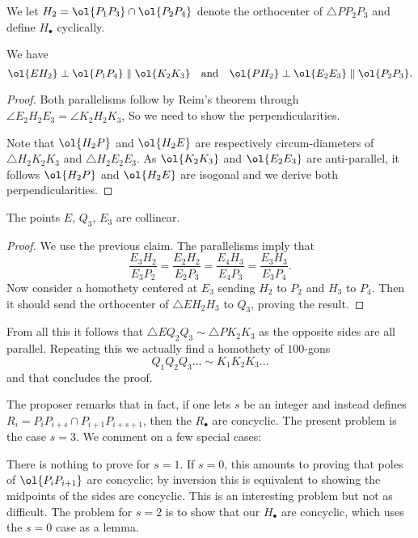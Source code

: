 We let $H_2 = \ol{P_1P_3} \cap \ol{P_2P_4}$
denote the orthocenter of $\triangle PP_2P_3$
and define $H_\bullet$ cyclically.
\begin{claim*}
  We have
  \[ \ol{EH_2} \perp \ol{P_1 P_4} \parallel \ol{K_2 K_3}
    \quad\text{and}\quad
    \ol{PH_2} \perp \ol{E_2 E_3} \parallel \ol{P_2 P_3}.  \]
\end{claim*}
\begin{proof}
  Both parallelisms follow by Reim's theorem through
  $\angle E_2 H_2 E_3 = \angle K_2 H_2 K_3$,
  So we need to show the perpendicularities.

  Note that $\ol{H_2 P}$ and $\ol{H_2 E}$
  are respectively circum-diameters of
  $\triangle H_2K_2K_3$ and $\triangle H_2E_2E_3$.
  As $\ol{K_2 K_3}$ and $\ol{E_2 E_3}$ are anti-parallel,
  it follows $\ol{H_2P}$ and $\ol{H_2E}$ are isogonal
  and we derive both perpendicularities.
\end{proof}

\begin{claim*}
  The points $E$, $Q_3$, $E_3$ are collinear.
\end{claim*}
\begin{proof}
  We use the previous claim.
  The parallelisms imply that
  \[ \frac{E_3H_2}{E_3P_2} = \frac{E_2H_2}{E_2P_3}
    = \frac{E_4H_3}{E_4P_3} = \frac{E_3H_3}{E_3P_4}. \]
  Now consider a homothety centered at $E_3$ sending $H_2$ to $P_2$
  and $H_3$ to $P_4$.
  Then it should send the orthocenter of $\triangle EH_2H_3$ to $Q_3$,
  proving the result.
\end{proof}

From all this it follows that $\triangle EQ_2Q_3 \sim \triangle PK_2K_3$
as the opposite sides are all parallel.
Repeating this we actually find a homothety of $100$-gons
\[ Q_1 Q_2 Q_3 \dots \sim K_1 K_2 K_3 \dots \]
and that concludes the proof.

\begin{remark*}
  The proposer remarks that in fact,
  if one lets $s$ be an integer
  and instead defines $R_i = P_i P_{i+s} \cap P_{i+1} P_{i+s+1}$,
  then the $R_\bullet$ are concyclic.
  The present problem is the case $s=3$.
  We comment on a few special cases:
  \begin{itemize}
    \ii There is nothing to prove for $s=1$.
    \ii If $s=0$, this amounts to proving
    that poles of $\ol{P_i P_{i+1}}$ are concyclic;
    by inversion this is equivalent to showing the
    midpoints of the sides are concyclic.
    This is an interesting problem but not as difficult.
    \ii The problem for $s=2$ is to show that our $H_\bullet$
    are concyclic, which uses the $s=0$ case as a lemma.
  \end{itemize}
\end{remark*}

